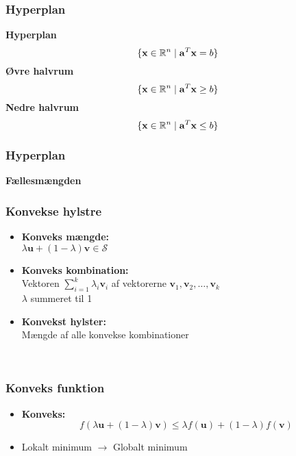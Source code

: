 \begin{frame}
\frametitle{Hyperplan}
\textbf{Hyperplan}
$$\{\textbf{x} \in \mathbb{R}^n \mid \mathbf{a}^T \mathbf{x}=b\}$$ 
%
\textbf{Øvre halvrum}
$$\{\textbf{x} \in \mathbb{R}^n \mid \mathbf{a}^T \mathbf{x} \geq b\}$$ 
\textbf{Nedre halvrum}
$$\{\textbf{x} \in \mathbb{R}^n \mid \mathbf{a}^T \mathbf{x} \leq b\}$$ 
\end{frame}

\begin{frame}
\frametitle{Hyperplan}
\textbf{Fællesmængden}

\end{frame}


\begin{frame}
\frametitle{Konvekse hylstre }
\begin{itemize}
\item \textbf{Konveks mængde: } \\
$\lambda \textbf{u} + (1- \lambda ) \textbf{v} \in \mathcal{S}$
\item \textbf{Konveks kombination: } \\ 
Vektoren $\sum_{i=1}^{k} \lambda_i \textbf{v}_i$ af vektorerne $\textbf{v}_1, \textbf{v}_2, \ldots, \textbf{v}_k$ 
\\ $\lambda$ summeret til 1
\item \textbf{Konvekst hylster: } \\
Mængde af alle konvekse kombinationer \\
\end{itemize}
\phantom{H} \\

\end{frame}

\begin{frame}
\frametitle{Konveks funktion}
\begin{itemize}
	\item \textbf{Konveks:} 
	$$f(\lambda \textbf{u} + (1- \lambda ) \textbf{v}) \leq \lambda f( \textbf{u}) + (1- \lambda ) f(\textbf{v}) $$ 
\end{itemize}

\begin{itemize}
\item Lokalt minimum $\rightarrow$ Globalt minimum
\end{itemize}
\phantom{H} \\
\phantom{H} \\
\end{frame}



